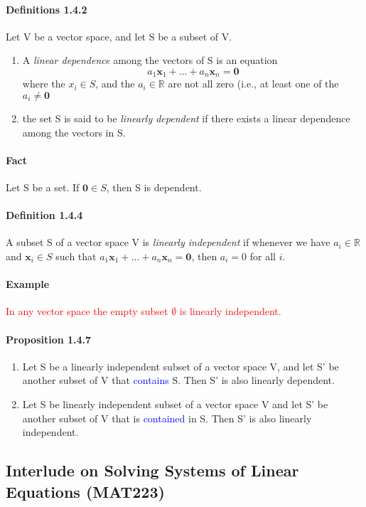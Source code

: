\documentclass[11pt]{article}
\newcommand{\ti}[1]{\textit{#1}}
\newcommand{\tb}[1]{\textbf{#1}}
\newcommand{\real}[0]{\mathbb{R}}
\newcommand{\vx}[0]{\tb{x}}
\newcommand{\vo}[0]{\tb{0}}
\begin{document}
	\paragraph{Definitions 1.4.2} Let V be a vector space, and let S be a subset of V.
	\begin{enumerate}
		\item A \ti{linear dependence} among the vectors of S is an equation
		$$a_1\vx_1 + \hdots + a_n\vx_n = \vo$$
		where the $x_i \in S$, and the $a_i \in \real$ are not all zero (i.e., at least one of the $a_i \neq \vo$
		\item the set S is said to be \ti{linearly dependent} if there exists a linear dependence among the vectors in S.
	\end{enumerate}
	
	\paragraph{Fact}
	Let S be a set. If $\vo \in S$, then S is dependent. 
	
	\paragraph{Definition 1.4.4} A subset S of a vector space V is \ti{linearly independent} if whenever we have $a_i \in \real$ and $\vx_i \in S$ such that $a_1\vx_1 + \hdots + a_n\vx_n = \vo$, then $a_i = 0$ for all $i$.
	
	\paragraph{Example}
	\textcolor{red}{In any vector space the empty subset $\emptyset$ is linearly independent.}
	\paragraph{Proposition 1.4.7}
	\begin{enumerate}
		\item Let S be a linearly independent subset of a vector space V, and let S' be another subset of V that \textcolor{blue}{contains} S. Then S' is also linearly dependent.
		\item Let S be linearly independent subset of a vector space V and let S' be another subset of V that is \textcolor{blue}{contained} in S. Then S' is also linearly independent.
	\end{enumerate}
	
	\subsection{Interlude on Solving Systems of Linear Equations (MAT223)}
\end{document}
